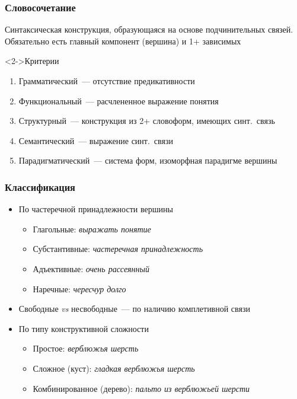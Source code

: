 \begin{frame}
  \frametitle{Словосочетание}

  Синтаксическая конструкция, образующаяся на основе подчинительных связей. Обязательно есть главный компонент (вершина) и 1+ зависимых

  \vfill

  \begin{block}<2->{Критерии}
    \begin{enumerate}
      \item Грамматический~--- отсутствие предикативности
      \item Функциональный~--- расчлененное выражение понятия
      \item Структурный~--- конструкция из 2+ словоформ, имеющих синт.\ связь
      \item Семантический~--- выражение синт.\ связи
      \item Парадигматический~--- система форм, изоморфная парадигме вершины
    \end{enumerate}
  \end{block}
\end{frame}

\begin{frame}
  \frametitle{Классификация}

  \begin{itemize}
    \item По частеречной принадлежности вершины \begin{itemize}
      \item Глагольные: \textit{выражать понятие}
      \item Субстантивные: \textit{частеречная принадлежность}
      \item Адъективные: \textit{очень рассеянный}
      \item Наречные: \textit{чересчур долго}
    \end{itemize}
    \item Свободные \textit{vs} несвободные~--- по наличию комплетивной связи
    \item По типу конструктивной сложности \begin{itemize}
      \item Простое: \textit{верблюжья шерсть}
      \item Сложное (куст): \textit{гладкая верблюжья шерсть}
      \item Комбинированное (дерево): \textit{пальто из верблюжьей шерсти}
    \end{itemize}
  \end{itemize}
\end{frame}

